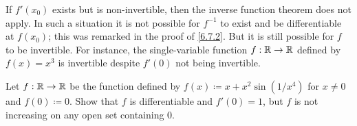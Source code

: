 \begin{note}
  If \(f'(x_0)\) exists but is non-invertible, then the inverse function theorem does not apply.
  In such a situation it is not possible for \(f^{-1}\) to exist and be differentiable at \(f(x_0)\);
  this was remarked in the proof of \cref{6.7.2}.
  But it is still possible for \(f\) to be invertible.
  For instance, the single-variable function \(f : \mathbb{R} \to \mathbb{R}\) defined by \(f(x) = x^3\) is invertible despite \(f'(0)\) not being invertible.
\end{note}

\exercisesection

\begin{ex}\label{ex:6.7.1}
  Let \(f : \mathbb{R} \to \mathbb{R}\) be the function defined by \(f(x) \coloneqq x + x^2 \sin(1 / x^4)\) for \(x \neq 0\) and \(f(0) \coloneqq 0\).
  Show that \(f\) is differentiable and \(f'(0) = 1\), but \(f\) is not increasing on any open set containing \(0\).
\end{ex}

